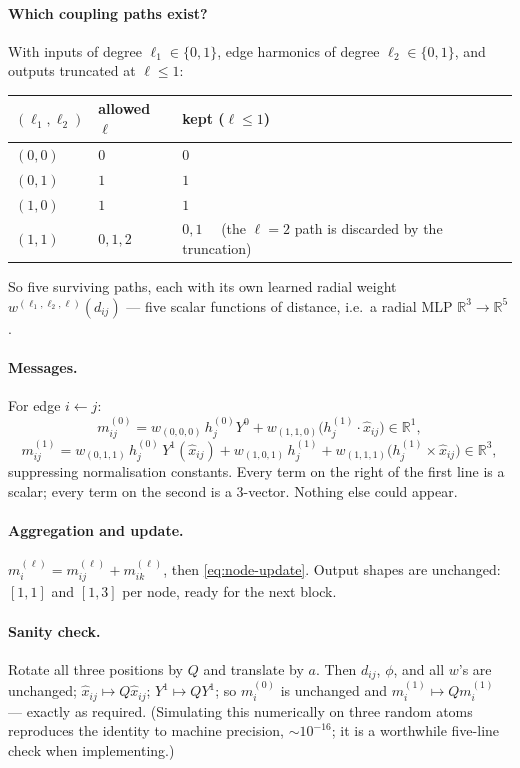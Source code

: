 \documentclass[11pt,a4paper]{report}
\theoremstyle{definition}
\theoremstyle{remark}
\newcommand{\RR}{\mathbb R}
\begin{document}
\paragraph{Which coupling paths exist?} With inputs of degree
$\ell_1\in\{0,1\}$, edge harmonics of degree $\ell_2\in\{0,1\}$, and outputs
truncated at $\ell\le1$:
\begin{center}
\begin{tabular}{lll}
\toprule
$(\ell_1,\ell_2)$ & allowed $\ell$ & kept ($\ell\le1$) \\
\midrule
$(0,0)$ & $0$ & $0$ \\
$(0,1)$ & $1$ & $1$ \\
$(1,0)$ & $1$ & $1$ \\
$(1,1)$ & $0,1,2$ & $0,1$ \ \ (the $\ell=2$ path is discarded by the truncation) \\
\bottomrule
\end{tabular}
\end{center}
So five surviving paths, each with its own learned radial weight
$w^{(\ell_1,\ell_2,\ell)}(d_{ij})$ --- five scalar functions of distance, i.e.\
a radial MLP $\RR^3\to\RR^5$.

\paragraph{Messages.} For edge $i\!\leftarrow\!j$:
\[
m^{(0)}_{ij}=w_{(0,0,0)}\,h^{(0)}_j Y^0 + w_{(1,1,0)}\bigl(h^{(1)}_j\cdot\hat x_{ij}\bigr)
\in\RR^{1},
\]
\[
m^{(1)}_{ij}=w_{(0,1,1)}\,h^{(0)}_j\,Y^1(\hat x_{ij})
+ w_{(1,0,1)}\,h^{(1)}_j
+ w_{(1,1,1)}\bigl(h^{(1)}_j\times\hat x_{ij}\bigr)
\in\RR^{3},
\]
suppressing normalisation constants. Every term on the right of the first
line is a scalar; every term on the second is a $3$-vector. Nothing else
could appear.

\paragraph{Aggregation and update.} $m^{(\ell)}_i=m^{(\ell)}_{ij}+m^{(\ell)}_{ik}$,
then \eqref{eq:node-update}. Output shapes are unchanged: $[1,1]$ and
$[1,3]$ per node, ready for the next block.

\paragraph{Sanity check.} Rotate all three positions by $Q$ and translate by
$a$. Then $d_{ij}$, $\phi$, and all $w$'s are unchanged; $\hat x_{ij}\mapsto Q\hat x_{ij}$;
$Y^1\mapsto QY^1$; so $m^{(0)}_i$ is unchanged and $m^{(1)}_i\mapsto Qm^{(1)}_i$
--- exactly as required. (Simulating this numerically on three random atoms
reproduces the identity to machine precision, $\sim10^{-16}$; it is a
worthwhile five-line check when implementing.)
\end{document}

